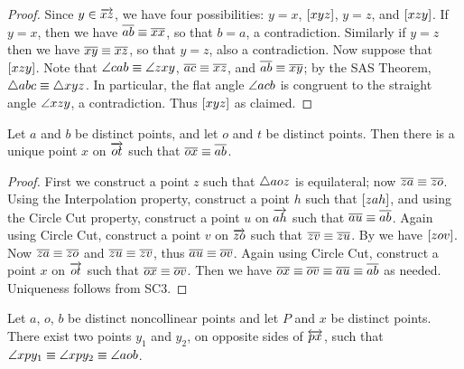 \begin{proof}
Since \(y \in \overrightarrow{xz}\), we have four possibilities: \(y = x\), \([ x y z ]\), \(y = z\), and \([ x z y ]\).
If \(y = x\), then we have \(\overline{ab} \equiv \overline{xx}\), so that \(b = a\), a contradiction.
Similarly if \(y = z\) then we have \(\overline{xy} \equiv \overline{xz}\), so that \(y = z\), also a contradiction.
Now suppose that \([ x z y ]\).
Note that \(\angle{cab} \equiv \angle{zxy}\), \(\overline{ac} \equiv \overline{xz}\), and \(\overline{ab} \equiv \overline{xy}\); by the SAS Theorem, \(\bigtriangleup{abc} \equiv \bigtriangleup{xyz}\).
In particular, the flat angle \(\angle{acb}\) is congruent to the straight angle \(\angle{xzy}\), a contradiction.
Thus \([ x y z ]\) as claimed.
\end{proof}

\begin{construct}
Let \(a\) and \(b\) be distinct points, and let \(o\) and \(t\) be distinct points.
Then there is a unique point \(x\) on \(\overrightarrow{ot}\) such that \(\overline{ox} \equiv \overline{ab}\).
\end{construct}

\begin{proof}
First we construct a point \(z\) such that \(\bigtriangleup{aoz}\) is equilateral; now \(\overline{za} \equiv \overline{zo}\).
Using the Interpolation property, construct a point \(h\) such that \([ z a h ]\), and using the Circle Cut property, construct a point \(u\) on \(\overrightarrow{ah}\) such that \(\overline{au} \equiv \overline{ab}\).
Again using Circle Cut, construct a point \(v\) on \(\overrightarrow{zo}\) such that \(\overline{zv} \equiv \overline{zu}\).
By  we have \([ z o v ]\).
Now \(\overline{za} \equiv \overline{zo}\) and \(\overline{zu} \equiv \overline{zv}\), thus \(\overline{au} \equiv \overline{ov}\).
Again using Circle Cut, construct a point \(x\) on \(\overrightarrow{ot}\) such that \(\overline{ox} \equiv \overline{ov}\).
Then we have \(\overline{ox} \equiv \overline{ov} \equiv \overline{au} \equiv \overline{ab}\) as needed.
Uniqueness follows from SC3.
\end{proof}

\begin{construct}
Let \(a\), \(o\), \(b\) be distinct noncollinear points and let \(P\) and \(x\) be distinct points.
There exist two points \(y_1\) and \(y_2\), on opposite sides of \(\overleftrightarrow{px}\), such that \(\angle{xpy_1} \equiv \angle{xpy_2} \equiv \angle{aob}\). 
\end{construct}

